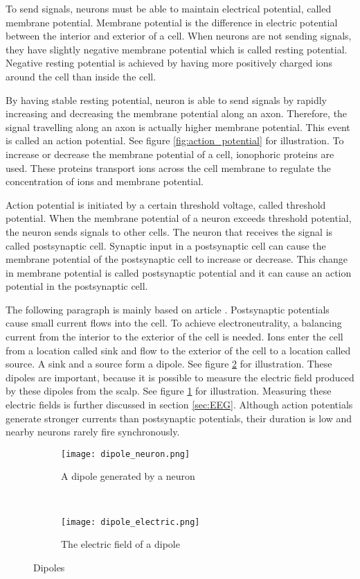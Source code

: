 To send signals, neurons must be able to maintain electrical potential, called membrane potential. Membrane potential is the difference in electric potential between the interior and exterior of a cell. When neurons are not sending signals, they have slightly negative membrane potential which is called resting potential. Negative resting potential is achieved by having more positively charged ions around the cell than inside the cell.

By having stable resting potential, neuron is able to send signals by rapidly increasing and decreasing the membrane potential along an axon. Therefore, the signal travelling along an axon is actually higher membrane potential. This event is called an action potential. See figure \ref{fig:action_potential} for illustration. To increase or decrease the membrane potential of a cell, ionophoric proteins are used. These proteins transport ions across the cell membrane to regulate the concentration of ions and membrane potential.

Action potential is initiated by a certain threshold voltage, called threshold potential. When the membrane potential of a neuron exceeds threshold potential, the neuron sends signals to other cells. The neuron that receives the signal is called postsynaptic cell. Synaptic input in a postsynaptic cell can cause the membrane potential of the postsynaptic cell to increase or decrease. This change in membrane potential is called postsynaptic potential and it can cause an action potential in the postsynaptic cell.

The following paragraph is mainly based on article \cite{electric_field}. Postsynaptic potentials cause small current flows into the cell. To achieve electroneutrality, a balancing current from the interior to the exterior of the cell is needed. Ions enter the cell from a location called sink and flow to the exterior of the cell to a location called source. A sink and a source form a dipole. See figure \ref{fig:dipole_electric} for illustration. These dipoles are important, because it is possible to measure the electric field produced by these dipoles from the scalp. See figure \ref{fig:dipole_neuron} for illustration. Measuring these electric fields is further discussed in section \ref{sec:EEG}. Although action potentials generate stronger currents than postsynaptic potentials, their duration is low and nearby neurons rarely fire synchronously.

\begin{figure}[b!]
	\centering
	\begin{subfigure}{0.48\textwidth}
		\texttt{[image: dipole\_neuron.png]}
		\caption{A dipole generated by a neuron \cite[p.~669]{neuroscience}}
		\label{fig:dipole_neuron}
	\end{subfigure}
	~
	\begin{subfigure}{0.48\textwidth}
		\texttt{[image: dipole\_electric.png]}
		\caption{The electric field of a dipole} %
		\label{fig:dipole_electric}
	\end{subfigure}
	\caption{Dipoles}
	\label{fig:dipole}
\end{figure}

